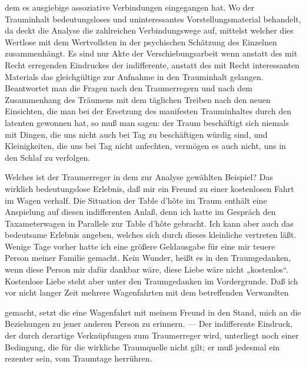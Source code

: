 \documentclass{article}
\begin{document}
         
            
            
            
        \pstart
        dem es ausgiebige assoziative Verbindungen eingegangen hat. Wo der
               Trauminhalt bedeutungsloses und uninteressantes Vorstellungsmaterial
               behandelt, da deckt die Analyse die zahlreichen Verbindungswege auf,
               mittelst welcher dies Wertlose mit dem Wertvollsten in der
               psychischen Schätzung des Einzelnen zusammenhängt. Es sind nur Akte der Verschiebungsarbeit wenn anstatt des
                  mit Recht erregenden Eindruckes der indifferente, anstatt des mit Recht
                  interessanten Materials das
                  gleichgültige zur Aufnahme in den
                  Trauminhalt gelangen. Beantwortet man die Fragen nach den Traumerregern
               und nach dem Zusammenhang des Träumens mit dem täglichen Treiben
               nach den neuen Einsichten, die man bei der Ersetzung des manifesten
               Trauminhaltes durch den latenten gewonnen hat, so muß man sagen: der Traum beschäftigt sich niemals mit Dingen, die uns
                  nicht auch bei Tag zu beschäftigen würdig sind, und Kleinigkeiten, die uns bei Tag
                  nicht anfechten, vermögen es auch nicht, uns in den Schlaf zu verfolgen.
        \pend
    
            
        \pstart
        Welches ist der Traumerreger in dem zur Analyse gewählten Beispiel? Das wirklich
               bedeutungslose Erlebnis, daß mir ein Freund zu einer kostenlosen Fahrt im Wagen verhalf. Die Situation der Table d’hôte im
               Traum enthält eine Anspielung auf diesen indifferenten Anlaß, denn ich hatte im
               Gespräch den Taxameterwagen in Parallele zur Table d’hôte gebracht. Ich
               kann aber auch das bedeutsame Erlebnis angeben, welches sich durch dieses
               kleinliche vertreten läßt. Wenige Tage vorher hatte ich eine größere Geldausgabe
               für eine mir teuere Person meiner Familie gemacht. Kein Wunder, heißt es in den
               Traumgedanken, wenn diese Person mir dafür dankbar wäre, diese Liebe wäre
               nicht „kostenlos“. Kostenlose Liebe steht aber unter den Traumgedanken im Vordergrunde. Daß ich vor nicht langer Zeit mehrere Wagenfahrten mit dem betreffenden Verwandten
        \pend
    
         
            
            
            
        \pstart
        gemacht, setzt die eine Wagenfahrt mit meinem Freund in den Stand,
               mich an die Beziehungen zu jener anderen Person zu erinnern. — Der indifferente
               Eindruck, der durch derartige Verknüpfungen zum Traumerreger wird,
               unterliegt noch einer Bedingung, die für die wirkliche Traumquelle nicht gilt;
               er muß jedesmal ein rezenter sein, vom Traumtage
               herrühren.
        \pend
    
\end{document}

